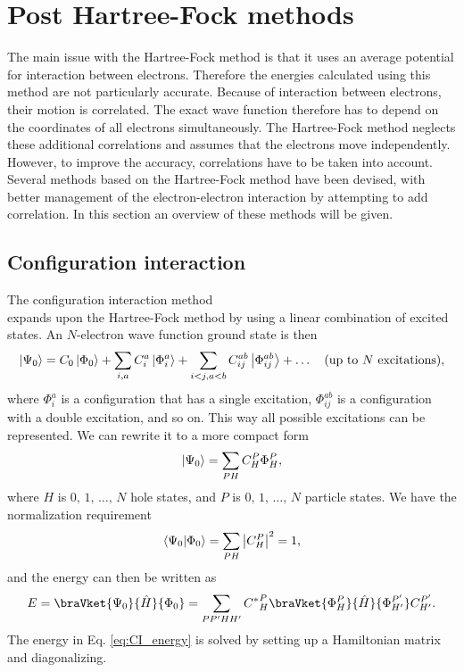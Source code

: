 \section{Post Hartree-Fock methods}

	The main issue with the Hartree-Fock method is that it uses an
        average potential for interaction between electrons. Therefore
        the energies calculated using this method are not particularly
        accurate. Because of interaction between electrons, their
        motion is correlated. The exact wave function therefore has to
        depend on the coordinates of all electrons simultaneously. The
        Hartree-Fock method neglects these additional correlations and assumes that
        the electrons move independently. However, to improve the
        accuracy, correlations have to be taken into account. Several
        methods based on the Hartree-Fock method have been devised,
        with better management of the electron-electron interaction by
        attempting to add correlation. In this section an overview of
        these methods will be given.

	\subsection{Configuration interaction}
		
		The configuration interaction method \cite{shavitt09} \\ \cite{maurice99} expands upon the Hartree-Fock method by using a linear combination of excited states. An $N$-electron wave function ground state is then
		\begin{equation}
			\ket{\Psi_0} = C_{0}\ket{\Phi_{0}} + \sum_{i,a} C_{i}^{a} \ket{\Phi_{i}^{a}} + \sum_{i<j,a<b} C_{ij}^{ab} \ket{\Phi_{ij}^{ab}} + \dots \quad \mbox{(up to $N$ excitations)},
		\end{equation}
		where $\Phi_{i}^{a}$ is a configuration that has a single excitation, $\Phi_{ij}^{ab}$ is a configuration with a double excitation, and so on. This way all possible excitations can be represented. We can rewrite it to a more compact form 
		\begin{equation}
			\ket{\Psi_0} = \sum_{PH}C_{H}^{P}\Phi_{H}^{P},
		\end{equation}
		where $H$ is $0,\,1,\,\dots,\,N$ hole states, and $P$ is $0,\,1,\,\dots,\,N$ particle states. We have the normalization requirement
		\begin{equation}
			\bra{\Psi_0}\ket{\Phi_0} = \sum_{PH}\left | C_{H}^{P}\right |^{2}=1,
		\end{equation}
		and the energy can then be written as
		\begin{equation} \label{eq:CI_energy}
			E = \braVket{\Psi_0}{\hat{H}}{\Phi_0} = \sum_{PP'HH'}{C^{*}}_{H}^{P} \braVket{\Phi_{H}^{P}}{\hat{H}}{\Phi_{H'}^{P'}} C_{H'}^{P'}.
		\end{equation}
		The energy in Eq. \eqref{eq:CI_energy} is solved by setting up a Hamiltonian matrix and diagonalizing. 

